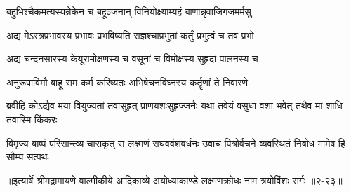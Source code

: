 \twolineshloka
{बहुभिश्चैकमत्यस्यन्नेकेन च बहूञ्जनान्}
{विनियोक्ष्याम्यहं बाणान्नृवाजिगजमर्मसु} %

\twolineshloka
{अद्य मेऽस्त्रप्रभावस्य प्रभावः प्रभविष्यति}
{राज्ञश्चाप्रभुतां कर्तुं प्रभुत्वं च तव प्रभो} %

\twolineshloka
{अद्य चन्दनसारस्य केयूरामोक्षणस्य च}
{वसूनां च विमोक्षस्य सुहृदां पालनस्य च} %

\twolineshloka
{अनुरूपाविमौ बाहू राम कर्म करिष्यतः}
{अभिषेचनविघ्नस्य कर्तॄणां ते निवारणे} %

\twolineshloka
{ब्रवीहि कोऽद्यैव मया वियुज्यतां तवासुहृत् प्राणयशःसुहृज्जनैः}
{यथा तवेयं वसुधा वशा भवेत् तथैव मां शाधि तवास्मि किंकरः} %

\twolineshloka
{विमृज्य बाष्पं परिसान्त्व्य चासकृत् स लक्ष्मणं राघववंशवर्धनः}
{उवाच पित्रोर्वचने व्यवस्थितं निबोध मामेष हि सौम्य सत्पथः} %


॥इत्यार्षे श्रीमद्रामायणे वाल्मीकीये आदिकाव्ये अयोध्याकाण्डे लक्ष्मणक्रोधः नाम त्रयोविंशः सर्गः ॥२-२३॥
